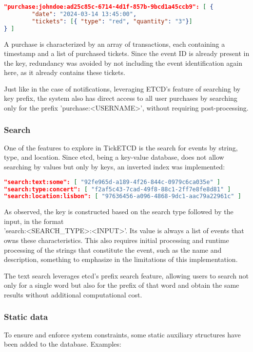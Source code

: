 \documentclass[screen,review]{acmart}
\begin{document}
\begin{lstlisting}[language=json]
"purchase:johndoe:ad25c85c-6714-4d1f-857b-9bcd1a45ccb9": [ {
        "date": "2024-03-14 13:45:00",
        "tickets": [{ "type": "red", "quantity": "3"}]
} ]
\end{lstlisting}

A purchase is characterized by an array of transactions, each containing a timestamp and a list of purchased tickets. Since the event ID is already present in the key, redundancy was avoided by not including the event identification again here, as it already contains these tickets.

Just like in the case of notifications, leveraging ETCD's feature of searching by key prefix, the system also has direct access to all user purchases by searching only for the prefix 'purchase:<USERNAME>', without requiring post-processing.

\subsubsection{Search}
One of the features to explore in TickETCD is the search for events by string, type, and location. Since etcd, being a key-value database, does not allow searching by values but only by keys, an inverted index was implemented:

\begin{lstlisting}[language=json]
"search:text:some": [ "92fe965d-a189-4f26-844c-0979c6ca035e" ]
"search:type:concert": [ "f2af5c43-7cad-49f8-88c1-2ff7e8fe8d81" ]
"search:location:lisbon": [ "97636456-a096-4868-9dc1-aac79a22961c" ]
\end{lstlisting}

As observed, the key is constructed based on the search type followed by the input, in the format \\ 'search:<SEARCH\_TYPE>:<INPUT>'. Its value is always a list of events that owns these characteristics. This also requires initial processing and runtime processing of the strings that constitute the event, such as the name and description, something to emphasize in the limitations of this implementation.

The text search leverages etcd's prefix search feature, allowing users to search not only for a single word but also for the prefix of that word and obtain the same results without additional computational cost.

\subsubsection{Static data}
To ensure and enforce system constraints, some static auxiliary structures have been added to the database. Examples:
\end{document}
